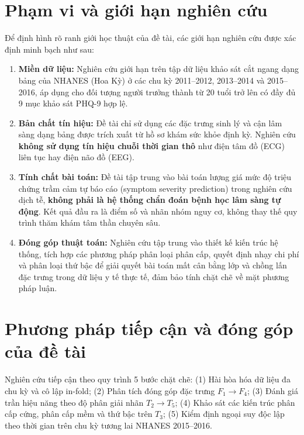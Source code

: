 \section{Phạm vi và giới hạn nghiên cứu}
\label{sec:pham-vi-nghien-cuu}

Để định hình rõ ranh giới học thuật của đề tài, các giới hạn nghiên cứu được xác định minh bạch như sau:
\begin{enumerate}
    \item \textbf{Miền dữ liệu:} Nghiên cứu giới hạn trên tập dữ liệu khảo sát cắt ngang dạng bảng của NHANES (Hoa Kỳ) ở các chu kỳ 2011--2012, 2013--2014 và 2015--2016, áp dụng cho đối tượng người trưởng thành từ 20 tuổi trở lên có đầy đủ 9 mục khảo sát PHQ-9 hợp lệ.
    \item \textbf{Bản chất tín hiệu:} Đề tài chỉ sử dụng các đặc trưng sinh lý và cận lâm sàng dạng bảng được trích xuất từ hồ sơ khám sức khỏe định kỳ. Nghiên cứu \textbf{không sử dụng tín hiệu chuỗi thời gian thô} như điện tâm đồ (ECG) liên tục hay điện não đồ (EEG).
    \item \textbf{Tính chất bài toán:} Đề tài tập trung vào bài toán lượng giá mức độ triệu chứng trầm cảm tự báo cáo (symptom severity prediction) trong nghiên cứu dịch tễ, \textbf{không phải là hệ thống chẩn đoán bệnh học lâm sàng tự động}. Kết quả đầu ra là điểm số và nhãn nhóm nguy cơ, không thay thế quy trình thăm khám tâm thần chuyên sâu.
    \item \textbf{Đóng góp thuật toán:} Nghiên cứu tập trung vào thiết kế kiến trúc hệ thống, tích hợp các phương pháp phân loại phân cấp, quyết định nhạy chi phí và phân loại thứ bậc để giải quyết bài toán mất cân bằng lớp và chồng lấn đặc trưng trong dữ liệu y tế thực tế, đảm bảo tính chặt chẽ về mặt phương pháp luận.
\end{enumerate}

\section{Phương pháp tiếp cận và đóng góp của đề tài}
\label{sec:dong-gop-nghien-cuu}

Nghiên cứu tiếp cận theo quy trình 5 bước chặt chẽ: (1) Hài hòa hóa dữ liệu đa chu kỳ và cô lập in-fold; (2) Phân tích đóng góp đặc trưng $F_1 \to F_4$; (3) Đánh giá trần hiệu năng theo độ phân giải nhãn $T_2 \to T_5$; (4) Khảo sát các kiến trúc phân cấp cứng, phân cấp mềm và thứ bậc trên $T_3$; (5) Kiểm định ngoại suy độc lập theo thời gian trên chu kỳ tương lai NHANES 2015--2016.

